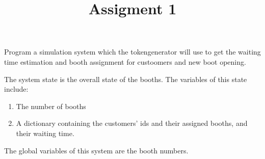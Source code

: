 \documentclass[article, 11pt, a4paper]{memoir}
\title{Assigment 1}
\begin{document}
\maketitle

\prob{}
{}{}{
    Program a simulation system which the tokengenerator will use to get the waiting time
    estimation and booth assignment for custoomers and new boot opening.
}

\begin{solution}
    [a]
    The system state is the overall state of the booths. The variables of this state
    include:
    \begin{enumerate}
        \item The number of booths
        \item A dictionary containing the customers' ids and their assigned booths, and
            their waiting time.
    \end{enumerate}
\end{solution}

\begin{solution}
    [b]
    The global variables of this system are the booth numbers.
\end{solution}
\end{document}
